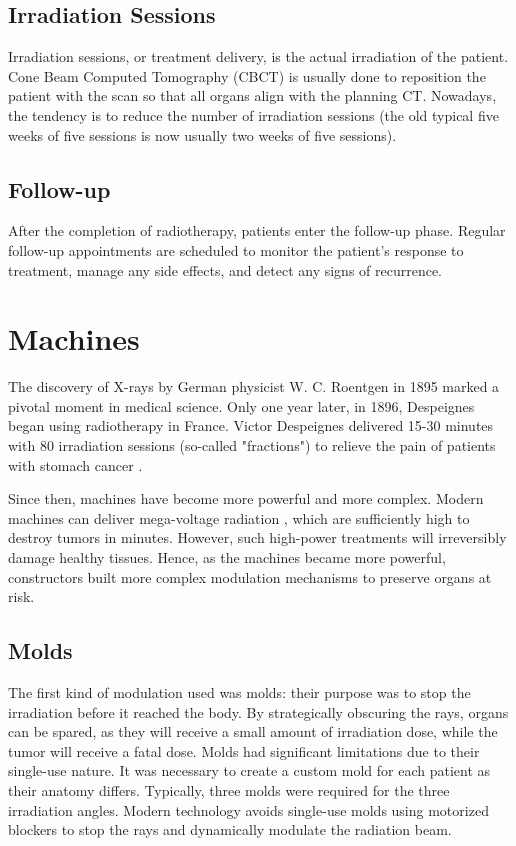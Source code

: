 \subsection{Irradiation Sessions}
Irradiation sessions, or treatment delivery, is the actual irradiation of the patient.
Cone Beam Computed Tomography (CBCT) is usually done to reposition the patient with the scan so that all organs align with the planning CT.
Nowadays, the tendency is to reduce the number of irradiation sessions (the old typical five weeks of five sessions is now usually two weeks of five sessions).

\subsection{Follow-up}
After the completion of radiotherapy, patients enter the follow-up phase.
Regular follow-up appointments are scheduled to monitor the patient's response to treatment, manage any side effects, and detect any signs of recurrence.






\section{Machines}
The discovery of X-rays by German physicist W. C. Roentgen in 1895 marked a pivotal moment in medical science.
Only one year later, in 1896, Despeignes began using radiotherapy in France.
Victor Despeignes delivered 15-30 minutes with 80 irradiation sessions (so-called "fractions") to relieve the pain of patients with stomach cancer \cite{Holsti1995}.

Since then, machines have become more powerful and more complex.
Modern machines can deliver mega-voltage radiation \cite{Huh2020}, which are sufficiently high to destroy tumors in minutes.
However, such high-power treatments will irreversibly damage healthy tissues.
Hence, as the machines became more powerful, constructors built more complex modulation mechanisms to preserve organs at risk.

\subsection{Molds}
The first kind of modulation used was molds: their purpose was to stop the irradiation before it reached the body.
By strategically obscuring the rays, organs can be spared, as they will receive a small amount of irradiation dose, while the tumor will receive a fatal dose.
Molds had significant limitations due to their single-use nature.
It was necessary to create a custom mold for each patient as their anatomy differs.
Typically, three molds were required for the three irradiation angles.
Modern technology avoids single-use molds using motorized blockers to stop the rays and dynamically modulate the radiation beam.

